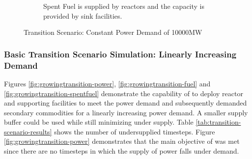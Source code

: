 \begin{figure}[]
\begin{subfigure}[t]{0.65\textwidth}
            \caption{Spent Fuel is supplied by reactors and the capacity is provided by sink facilities.}
            \label{fig:constanttransition-spentfuel}
        \end{subfigure}
        \caption{Transition Scenario: Constant Power Demand of 10000MW}
    \end{figure}

\subsubsection{Basic Transition Scenario Simulation: Linearly Increasing Demand}

Figures \ref{fig:growingtransition-power}, \ref{fig:growingtransition-fuel}
and \ref{fig:growingtransition-spentfuel} demonstrate the capability 
of \deploy to deploy reactor and supporting facilities to meet the
power demand and subsequently demanded secondary commodities 
for a linearly increasing power demand. 
A smaller supply buffer could be used while still minimizing under supply.
Table \ref{tab:transition-scenario-results} shows the number of 
undersupplied timesteps. 
Figure \ref{fig:growingtransition-power} demonstrates that
the main objective of \deploy was met since there are no timesteps
in which the supply of power falls under demand.

